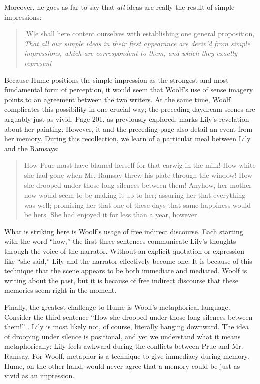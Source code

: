 Moreover, he goes as far to say that \emph{all} ideas are really the result of simple impressions:

\blockcquote[][4]{hume_78}[.]{[W]e shall here content ourselves with establishing one general proposition, \emph{That all our simple ideas in their first appearance are deriv'd from simple impressions, which are correspondent to them, and which they exactly represent}}

Because Hume positions the simple impression as the strongest and most fundamental form of perception, it would seem that Woolf's use of sense imagery points to an agreement between the two writers. At the same time, Woolf complicates this possibility in one crucial way; the preceding daydream scenes are arguably just as vivid. Page 201, as previously explored, marks Lily's revelation about her painting. However, it and the preceding page also detail an event from her memory. During this recollection, we learn of a particular meal between Lily and the Ramsays:

\blockcquote[][200-201]{woolf_81}[.]{How Prue must have blamed herself for that earwig in the milk! How white she had gone when Mr. Ramsay threw his plate through the window! How she drooped under those long silences between them! Anyhow, her mother now would seem to be making it up to her; assuring her that everything was well; promising her that one of these days that same happiness would be hers. She had enjoyed it for less than a year, however}

What is striking here is Woolf's usage of free indirect discourse. Each starting with the word ``how,'' the first three sentences communicate Lily's thoughts through the voice of the narrator. Without an explicit quotation or expression like ``she said,'' Lily and the narrator effectively become one. It is because of this technique that the scene appears to be both immediate and mediated. Woolf is writing about the past, but it is because of free indirect discourse that these memories seem right in the moment.

Finally, the greatest challenge to Hume is Woolf's metaphorical language. Consider the third sentence \enquote{How she drooped under those long silences between them!} \autocite[201]{woolf_81}. Lily is most likely not, of course, literally hanging downward. The idea of drooping under silence is positional, and yet we understand what it means metaphorically: Lily feels awkward during the conflicts between Prue and Mr. Ramsay. For Woolf, metaphor is a technique to give immediacy during memory. Hume, on the other hand, would never agree that a memory could be just as vivid as an impression.

